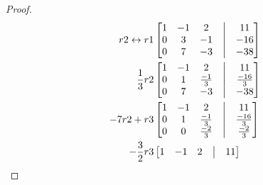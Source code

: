 \documentclass[12pt]{article}
\begin{document}
\begin{enumerate}
\begin{enumerate}
\begin{proof}
\begin{align*}
                                            r2\leftrightarrow r1
                                             &
                                            \begin{bmatrix}
                                                    1 & -1 & 2  & \bigm| & 11  \\
                                                    0 & 3  & -1 & \bigm| & -16 \\
                                                    0 & 7  & -3 & \bigm| & -38 \\
                                            \end{bmatrix} \\
                                            \frac{1}{3}r2
                                             &
                                            \begin{bmatrix}
                                                    1 & -1 & 2            & \bigm| & 11            \\
                                                    0 & 1  & \frac{-1}{3} & \bigm| & \frac{-16}{3} \\
                                                    0 & 7  & -3           & \bigm| & -38           \\
                                            \end{bmatrix} \\
                                            -7r2+r3
                                             &
                                            \begin{bmatrix}
                                                    1 & -1 & 2            & \bigm| & 11            \\
                                                    0 & 1  & \frac{-1}{3} & \bigm| & \frac{-16}{3} \\
                                                    0 & 0  & \frac{-2}{3} & \bigm| & \frac{-2}{3}  \\
                                            \end{bmatrix} \\
                                            -\frac{3}{2}r3
                                             &
                                            \begin{bmatrix}
                                                    1 & -1 & 2            & \bigm| & 11            \\

\end{bmatrix}
\end{align*}
\end{proof}
\end{enumerate}
\end{enumerate}
\end{document}
